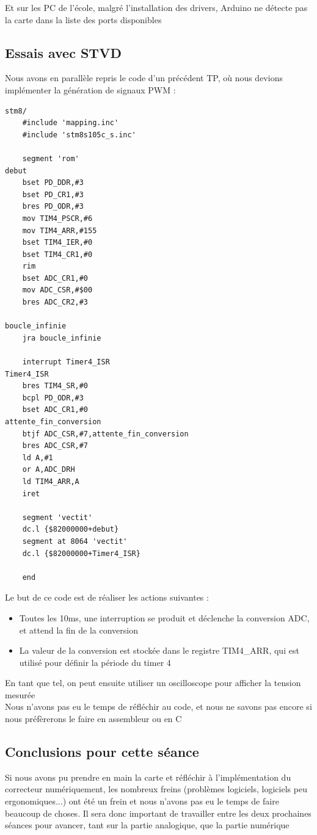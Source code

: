 \documentclass[11pt,a4paper]{article}
\begin{document}
Et sur les PC de l'école, malgré l'installation des drivers, Arduino ne détecte pas la carte dans la liste des ports disponibles

\subsection{Essais avec STVD}
Nous avons en parallèle repris le code d'un précédent TP, où nous devions implémenter la génération de signaux PWM :
\begin{lstlisting}[language={[x86masm]Assembler}]
stm8/
    #include 'mapping.inc'
    #include 'stm8s105c_s.inc'

    segment 'rom'
debut
    bset PD_DDR,#3
    bset PD_CR1,#3
    bres PD_ODR,#3
    mov TIM4_PSCR,#6
    mov TIM4_ARR,#155
    bset TIM4_IER,#0
    bset TIM4_CR1,#0
    rim
    bset ADC_CR1,#0
    mov ADC_CSR,#$00
    bres ADC_CR2,#3

boucle_infinie
    jra boucle_infinie

    interrupt Timer4_ISR
Timer4_ISR
    bres TIM4_SR,#0
    bcpl PD_ODR,#3
    bset ADC_CR1,#0
attente_fin_conversion
    btjf ADC_CSR,#7,attente_fin_conversion
    bres ADC_CSR,#7
    ld A,#1
    or A,ADC_DRH
    ld TIM4_ARR,A
    iret

    segment 'vectit'
    dc.l {$82000000+debut}
    segment at 8064 'vectit'
    dc.l {$82000000+Timer4_ISR}

    end
\end{lstlisting}

Le but de ce code est de réaliser les actions suivantes :
\begin{itemize}
\item Toutes les 10ms, une interruption se produit et déclenche la conversion ADC, et attend la fin de la conversion
\item La valeur de la conversion est stockée dans le registre TIM4\_ARR, qui est utilisé pour définir la période du timer 4
\end{itemize}
En tant que tel, on peut ensuite utiliser un oscilloscope pour afficher la tension mesurée\\

Nous n'avons pas eu le temps de réfléchir au code, et nous ne savons pas encore si nous préfèrerons le faire en assembleur ou en C

\subsection{Conclusions pour cette séance}
Si nous avons pu prendre en main la carte et réfléchir à l'implémentation du correcteur numériquement, les nombreux freins (problèmes logiciels, logiciels peu ergonomiques...) ont été un frein et nous n'avons pas eu le temps de faire beaucoup de choses. Il sera donc important de travailler entre les deux prochaines séances pour avancer, tant sur la partie analogique, que la partie numérique
\end{document}
